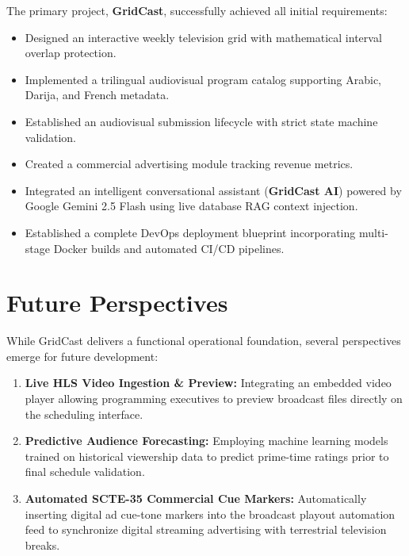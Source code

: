 \documentclass[12pt,a4paper,oneside]{report}
\begin{document}
The primary project, \textbf{GridCast}, successfully achieved all initial requirements:
\begin{itemize}
    \item Designed an interactive weekly television grid with mathematical interval overlap protection.
    \item Implemented a trilingual audiovisual program catalog supporting Arabic, Darija, and French metadata.
    \item Established an audiovisual submission lifecycle with strict state machine validation.
    \item Created a commercial advertising module tracking revenue metrics.
    \item Integrated an intelligent conversational assistant (\textbf{GridCast AI}) powered by Google Gemini 2.5 Flash using live database RAG context injection.
    \item Established a complete DevOps deployment blueprint incorporating multi-stage Docker builds and automated CI/CD pipelines.
\end{itemize}

\section*{Future Perspectives}
While GridCast delivers a functional operational foundation, several perspectives emerge for future development:
\begin{enumerate}
    \item \textbf{Live HLS Video Ingestion \& Preview:} Integrating an embedded video player allowing programming executives to preview broadcast files directly on the scheduling interface.
    \item \textbf{Predictive Audience Forecasting:} Employing machine learning models trained on historical viewership data to predict prime-time ratings prior to final schedule validation.
    \item \textbf{Automated SCTE-35 Commercial Cue Markers:} Automatically inserting digital ad cue-tone markers into the broadcast playout automation feed to synchronize digital streaming advertising with terrestrial television breaks.
\end{enumerate}

\newpage
\end{document}
